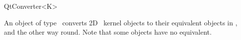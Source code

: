 
\begin{ccRefClass}{QtConverter<K>}

\ccDefinition
An object of type \ccRefName\ converts 2D \cgal\ kernel objects to their equivalent 
objects in \qt, and the other way round. Note that some objects have no equivalent.



\ccOperations


\end{ccRefClass}







